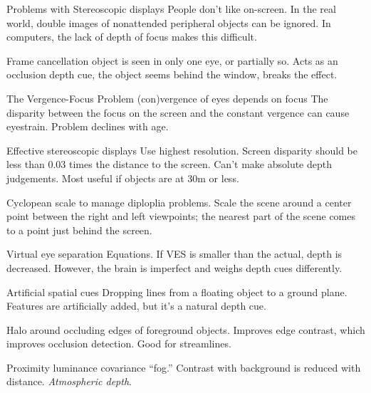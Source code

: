 \begin{mdframed}
\begin{multicols}{2}
\begin{compactdesc}
\item[Problems with Stereoscopic displays] People don't like on-screen. In the
    real world, double images of nonattended peripheral objects can be ignored.
    In computers, the lack of depth of focus makes this difficult.
\item[Frame cancellation] object is seen in only one eye, or partially so.
    Acts as an occlusion depth cue, the object seems behind the
    window, breaks the effect.
\item[The Vergence-Focus Problem] (con)vergence of eyes depends on focus
    The disparity between the focus on the screen and the constant vergence can
    cause eyestrain.
    Problem declines with age.
\item[Effective stereoscopic displays]
    Use highest resolution. Screen disparity should be less than 0.03 times the
    distance to the screen.
    Can't make absolute depth judgements.
    Most useful if objects are at 30m or less.
\item[Cyclopean scale] to manage diploplia problems.
    Scale the scene around a center point between the
    right and left viewpoints; the nearest part of the
    scene comes to a point just behind the screen.
\item[Virtual eye separation]
    Equations. If VES is smaller than the actual, depth is decreased. However,
    the brain is imperfect and weighs depth cues differently.
\item[Artificial spatial cues] Dropping lines from a floating object to a
    ground plane.
    Features are artificially added, but it's a natural depth cue.
\item[Halo] around occluding edges of foreground objects. Improves edge contrast,
    which improves occlusion detection. Good for streamlines.
\item[Proximity luminance covariance] ``fog.'' Contrast with background is
    reduced with distance.
    \emph{Atmospheric depth}.
\end{compactdesc}
\end{multicols}\end{mdframed}


